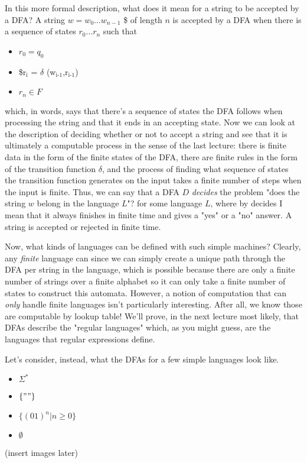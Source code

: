 \documentclass[11pt]{article}
\begin{document}
In this more formal description, what does it mean for a string to be accepted by a DFA? A string $w = w_0 \ldots w_{n-1}$ \$ of length $n$ is accepted by a DFA when there is a sequence of states $r_0 \ldots r_n$ such that 
\begin{itemize}
\item $r_0 = q_0$
\item \$r$_{\text{i}}$ = $\delta$ (w$_{\text{i-1}}$,r$_{\text{i-1}}$)
\item $r_n \in F$
\end{itemize}
which, in words, says that there's a sequence of states the DFA follows when processing the string and that it ends in an accepting state. Now we can look at the description of deciding whether or not to accept a string and see that it is ultimately a computable process in the sense of the last lecture: there is finite data in the form of the finite states of the DFA, there are finite rules in the form of the transition function $\delta$, and the process of finding what sequence of states the transition function generates on the input takes a finite number of steps when the input is finite. Thus, we can say that a DFA $D$ \emph{decides} the problem "does the string $w$ belong in the language $L$"? for some language $L$, where by decides I mean that it always finishes in finite time and gives a "yes" or a "no" answer. A string is accepted or rejected in finite time.

Now, what kinds of languages can be defined with such simple machines? Clearly, any \emph{finite} language can since we can simply create a unique path through the DFA per string in the language, which is possible because there are only a finite number of strings over a finite alphabet so it can only take a finite number of states to construct this automata. However, a notion of computation that can \emph{only} handle finite languages isn't particularly interesting. After all, we know those are computable by lookup table! We'll prove, in the next lecture most likely, that DFAs describe the "regular languages" which, as you might guess, are the languages that regular expressions define. 

Let's consider, instead, what the DFAs for a few simple languages look like.
\begin{itemize}
\item $\Sigma^*$
\item $\{""\}$
\item $\{(01)^n | n \geq 0\}$
\item $\emptyset$
\end{itemize}
(insert images later)
\end{document}

